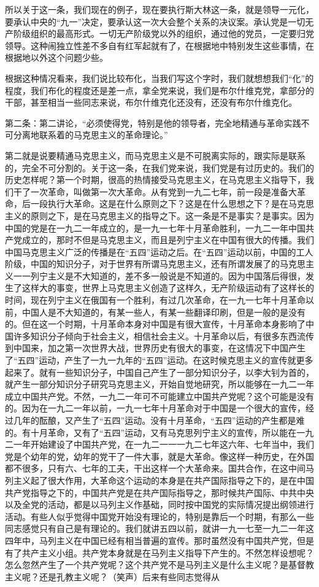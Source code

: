 所以关于这一条，我们现在的例子，现在要执行斯大林这一条，就是领导一元化，要承认中央的“九一”决定，要承认这一次大会整个关系的决议案。承认党是一切无产阶级组织的最高形式。一切无产阶级党以外的组织，通过他的党员，一定要归党领导。这种闹独立性差不多自有红军起就有了，在根据地中特别发生这些事情，在根据地以外这个问题少些。

根据这种情况看来，我们说比较布化，当我们写这个字时，我们就想想我们“化”的程度，我们布化的程度还是差一点，拿全党来说，我们是布尔什维克党，拿部分的干部，甚至相当一些同志来说，布尔什维克化还没有，还没有布尔什维克化。

第二条：第二讲论，“必须使得党，特别是他的领导者，完全地精通与革命实践不可分离地联系着的马克思主义的革命理论。”

第二就是说要精通马克思主义，而马克思主义是不可脱离实际的，跟实际是联系的，完全不可分割的。关于这一条，在我们党来说，我们党是有过历史的。我们的历史怎样呢？第一个时期，很高的热情接受马克思主义，在马克思主义指导下，我们干了一次革命，叫做第一次大革命。从有党到一九二七年，前一段是准备大革命，后一段执行大革命。这是在什么原则之下？这是在什么思想之下？是在马克思主义的原则之下，是在马克思主义的指导之下。这一条是不是事实？是事实。因为中国的党是在一九二一年成立的，是一九一七年十月革命胜利，一九二一年中国共产党成立的，那时不但是马克思主义，而且是列宁主义在中国有很大的传播。我们中国马克思主义广泛的传播是在“五四”运动之后。在“五四”运动以前，中国的工人阶级，中国的知识分子，对于世界有所谓马克思主义，还有所谓发展了的马克思主义一一列宁主义是不大知道的，差不多一般说是不知道的。因为中国落后得很，发生了这样大的事变，世界上马克思主义创造了这样久，无产阶级运动有了这样长的时间，现在列宁主义在俄国有一个胜利，有过几次革命，在一九一七年十月革命以前，中国人是不大知道的，有某一些人，有某一些翻译印刷，但是一般的是没有的。但在这一个时期，十月革命本身对中国是有很大宣传，十月革命本身影响了中国许多知识分子倾向于社会主义，相信社会主义。十月革命以后，有很多东西流传到中国来，加之第一次世界大战，世界历史有很大的事变，在这情况下中国产生了“五四”运动，产生了一九一九年的“五四”运动。在这时候克思主义的宣传就更多起来了。就有一些知识分子，中国自己产生了一部分知识分子，以李大钊为首的，就产生一部分知识分子研究马克思主义，开始自觉地研究，所以能够在一九二一年成立中国共产党。不然，一九二一年可不可能建立中国共产党呢？这个可能是没有的。因为在一九二一年以前，一九一七年十月革命对于中国是一个很大的宣传，经过几年的酝酿，又产生了“五四”运动。没有十月革命，“五四”运动的产生都是难的。有十月革命，又有了“五四”运动，又有马克思列宁主义的宣传，所以能在一九二一年开始建设了中国共产党，在一九二一一一九二七年这六年、七年当中，我们党是个幼年的党，幼年的党干了一件大事，就是大革命。像这样一种历史，在外国都不很多，只有六、七年的工夫，干出这样一个大革命来。国共合作，在这中间马列主义起了很大作用，大革命这个运动的本身是在共产国际指导之下的，是在中国共产党指导之下的，中国共产党是在共产国际指导之，那时候共产国际、中共中央以及全党的活动，都是以马列主义作基础，同时按中国党的实际情况提出纲领进行活动。有些人似乎觉得中国党开始没有理论的，特别是靠后一个时期，有那么一些同志感觉只有自己是有理论的。我们就讲五四以前，就讲一九一七至一九二一年这四年中，马列主义在中国已经有相当普遍的宣传。那时虽然没有中国共产党，但是有了共产主义小组。共产党本身就是在马列主义指导下产生的。不然怎样设想呢？怎么忽然产生了一个共产党呢？这个共产党不是马列主义是什么主义呢？是基督教主义呢？还是孔教主义呢？（笑声）后来有些同志觉得从